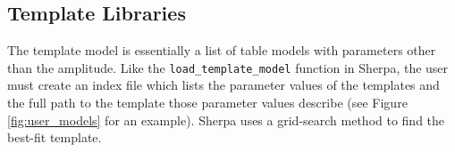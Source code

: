 \subsection{Template Libraries}
The template model is essentially a list of table models with parameters other than the amplitude. Like the \texttt{load\_template\_model} function in Sherpa, the user must create an index file which lists the parameter values of the templates and the full path to the template those parameter values describe (see Figure \ref{fig:user_models} for an example). Sherpa uses a grid-search method to find the best-fit template.